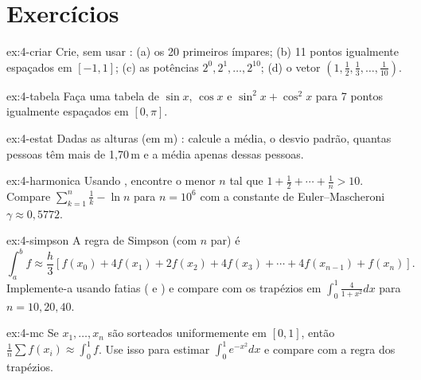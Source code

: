 \section{Exercícios}

\begin{exercicio}{ex:4-criar}
Crie, sem usar : (a) os 20 primeiros ímpares; (b) 11 pontos igualmente espaçados em $[-1,1]$;
(c) as potências $2^0, 2^1,\dots,2^{10}$; (d) o vetor $\left(1,\frac12,\frac13,\dots,\frac1{10}\right)$.
\end{exercicio}

\begin{exercicio}[tabela]{ex:4-tabela}
Faça uma tabela de $\sin x$, $\cos x$ e $\sin^2x+\cos^2x$ para 7 pontos igualmente espaçados em $[0, \pi]$.
\end{exercicio}

\begin{exercicio}[estatística]{ex:4-estat}
Dadas as alturas (em m) : calcule a média, o
desvio padrão, quantas pessoas têm mais de 1{,}70\,m e a média apenas dessas pessoas.
\end{exercicio}

\begin{exercicio}{ex:4-harmonica}
Usando , encontre o menor $n$ tal que $1+\frac12+\cdots+\frac1n>10$. Compare
$\sum_{k=1}^n\frac1k - \ln n$ para $n=10^6$ com a constante de Euler--Mascheroni $\gamma\approx0{,}5772$.
\end{exercicio}

\begin{exercicio}{ex:4-simpson}
A regra de Simpson (com $n$ par) é
\[\int_a^b f\approx \frac h3\left[f(x_0)+4f(x_1)+2f(x_2)+4f(x_3)+\cdots+4f(x_{n-1})+f(x_n)\right].\]
Implemente-a usando fatias ( e ) e compare com os trapézios em
$\int_0^1\frac{4}{1+x^2}dx$ para $n=10, 20, 40$.
\end{exercicio}

\begin{exercicio}{ex:4-mc}
Se $x_1,\dots,x_n$ são sorteados uniformemente em $[0,1]$, então $\frac1n\sum f(x_i)\approx\int_0^1 f$. Use isso
para estimar $\int_0^1 e^{-x^2}dx$ e compare com a regra dos trapézios.
\end{exercicio}
